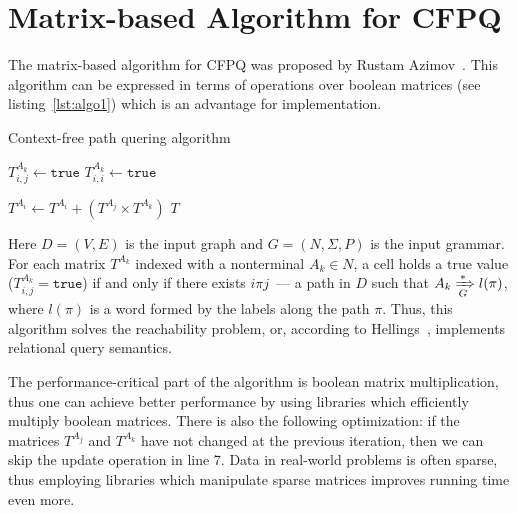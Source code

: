 \section{Matrix-based Algorithm for CFPQ}

The matrix-based algorithm for CFPQ was proposed by Rustam Azimov~\cite{Azimov:2018:CPQ:3210259.3210264}.
This algorithm can be expressed in terms of operations over boolean matrices (see listing~\ref{lst:algo1}) which is an advantage for implementation.
{\small
\begin{algorithm}
\begin{algorithmic}[1]
\caption{Context-free path quering algorithm}
\label{lst:algo1}
          {$T^{A_k}_{i,j} \gets \texttt{true}$}
    \EndFor
       {$T^{A_k}_{i,i} \gets \texttt{true}$}
    \EndFor

          { $T^{A_i} \gets T^{A_i} + (T^{A_j} \times T^{A_k})$ } 
        \EndFor
    \EndWhile
\State \Return $T$
\EndFunction
\end{algorithmic}
\end{algorithm}
}

Here $D = (V, E)$ is the input graph and $G = (N,\Sigma,P)$ is the input grammar.
For each matrix $T^{A_k}$ indexed with a nonterminal $A_k \in N$, a cell holds a true value ($T^{A_k}_{i,j} = \texttt{true}$) if and only if there exists $i \pi j$~--- a path in $D$ such that $A_k \xRightarrow[G]{*} l(\pi) $, where $l(\pi)$ is a word formed by the labels along the path $\pi$.
Thus, this algorithm solves the reachability problem, or, according to Hellings~\cite{hellingsRelational}, implements relational query semantics.

The performance-critical part of the algorithm is boolean matrix multiplication, thus one can achieve better performance by using libraries which efficiently multiply boolean matrices. 
There is also the following optimization: if the matrices $T^{A_j}$ and $T^{A_k}$ have not changed at the previous iteration, then we can skip the update operation in line 7.
Data in real-world problems is often sparse, thus employing libraries which manipulate sparse matrices improves running time even more. 
